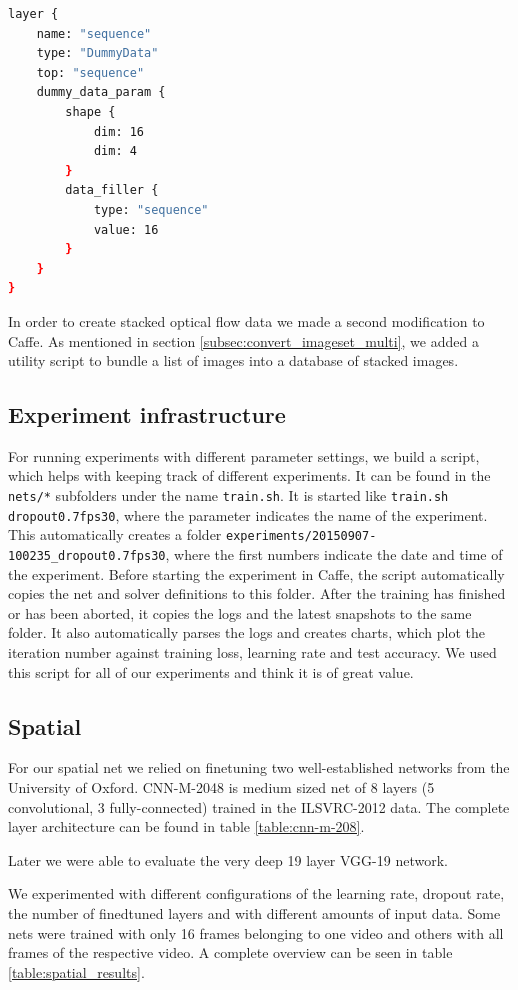\begin{lstlisting}[language=sh, caption=Sequence Layer, label=lst:seq-layer]
layer {
	name: "sequence"
	type: "DummyData"
	top: "sequence"
	dummy_data_param {
		shape {
			dim: 16
			dim: 4
		}
		data_filler {
			type: "sequence"
			value: 16
		}
	}
}
\end{lstlisting}

In order to create stacked optical flow data we made a second modification to Caffe.
As mentioned in section \ref{subsec:convert_imageset_multi}, we added a utility script to bundle a list of images into a database of stacked images.

\subsection{Experiment infrastructure}
For running experiments with different parameter settings, we build a script, which helps with keeping track of different experiments.
It can be found in the \texttt{nets/*} subfolders under the name \texttt{train.sh}.
It is started like \texttt{train.sh dropout0.7fps30}, where the parameter indicates the name of the experiment.
This automatically creates a folder \texttt{experiments/20150907-100235\_dropout0.7fps30}, where the first numbers indicate the date and time of the experiment.
Before starting the experiment in Caffe, the script automatically copies the net and solver definitions to this folder.
After the training has finished or has been aborted, it copies the logs and the latest snapshots to the same folder.
It also automatically parses the logs and creates charts, which plot the iteration number against training loss, learning rate and test accuracy.
We used this script for all of our experiments and think it is of great value.

\subsection{Spatial}
\label{subsec:spatial}
For our spatial net we relied on finetuning two well-established networks from the University of Oxford. 
CNN-M-2048 \cite{chatfield2014return} is medium sized net of 8 layers (5 convolutional, 3 fully-connected) trained in the ILSVRC-2012 data. The complete layer architecture can be found in table \ref{table:cnn-m-208}.

Later we were able to evaluate the very deep 19 layer VGG-19 \cite{simonyan2014very} network. 

We experimented with different configurations of the learning rate, dropout rate, the number of finedtuned layers and with different amounts of input data. Some nets were trained with only 16 frames belonging to one video and others with all frames of the respective video. A complete overview can be seen in table \ref{table:spatial_results}.

